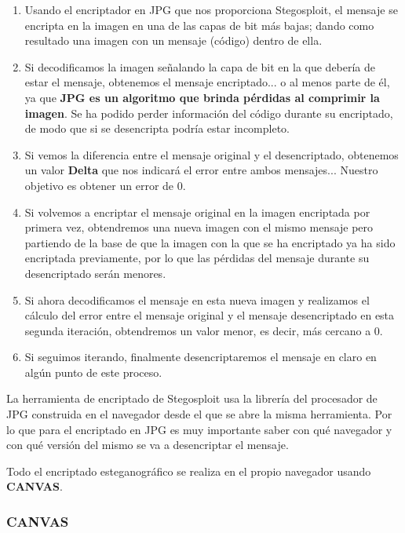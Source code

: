 \begin{enumerate}
\item Usando el encriptador en JPG que nos proporciona Stegosploit, el mensaje se encripta en la imagen en una de las capas de bit más bajas; dando como resultado una imagen con un mensaje (código) dentro de ella.
\item Si decodificamos la imagen señalando la capa de bit en la que debería de estar el mensaje, obtenemos el mensaje encriptado... o al menos parte de él, ya que \textbf{JPG es un algoritmo que brinda pérdidas al comprimir la imagen}. Se ha podido perder información del código durante su encriptado, de modo que si se desencripta podría estar incompleto.
\item Si vemos la diferencia entre el mensaje original y el desencriptado, obtenemos un valor \textbf{Delta} que nos indicará el error entre ambos mensajes... Nuestro objetivo es obtener un error de 0.
\item Si volvemos a encriptar el mensaje original en la imagen encriptada por primera vez, obtendremos una nueva imagen con el mismo mensaje pero partiendo de la base de que la imagen con la que se ha encriptado ya ha sido encriptada previamente, por lo que las pérdidas del mensaje durante su desencriptado serán menores.
\item Si ahora decodificamos el mensaje en esta nueva imagen y realizamos el cálculo del error entre el mensaje original y el mensaje desencriptado en esta segunda iteración, obtendremos un valor menor, es decir, más cercano a 0.
\item Si seguimos iterando, finalmente desencriptaremos el mensaje en claro en algún punto de este proceso.
\end{enumerate}

La herramienta de encriptado de Stegosploit usa la librería del procesador de JPG construida en el navegador desde el que se abre la misma herramienta. Por lo que para el encriptado en JPG es muy importante saber con qué navegador y con qué versión del mismo se va a desencriptar el mensaje.

Todo el encriptado esteganográfico se realiza en el propio navegador usando \textbf{CANVAS}. %

\subsubsection{CANVAS}

